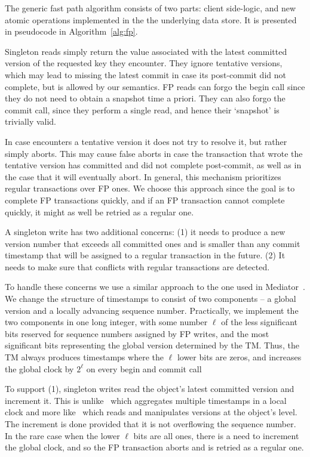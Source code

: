 The generic fast  path algorithm consists of two parts: 
client side-logic, and new atomic operations implemented in the the underlying data store.
It is presented in pseudocode in Algorithm~\ref{alg:fp}. 

Singleton reads simply return the value associated with the  latest committed version of the requested key they encounter.  
They ignore tentative versions, which may lead to missing the latest commit in case its post-commit did not complete, 
but is allowed by our semantics. 
FP reads can forgo the begin call since they do not need to obtain a snapshot time a priori. 
They can also forgo the commit call, since they perform a single read, and hence their `snapshot' is trivially valid.

In case   encounters a tentative version it does not try to resolve it, but rather simply aborts.
This may cause false aborts in case the transaction that wrote the tentative version has committed and did not 
complete post-commit, as well as in the case that it will eventually abort. 
In general, this mechanism prioritizes regular transactions over FP ones. We choose this approach since
the goal is to complete FP transactions quickly, and if an FP transaction cannot complete quickly, it might as well be 
retried as a regular one.
   
A singleton write has two additional concerns: (1) it needs to  produce a new version number that exceeds all committed ones and
is smaller than any commit timestamp that will be assigned to a regular transaction in the future.
(2)  It needs to make sure that conflicts with regular transactions are detected. 

To handle these concerns we use a similar approach to the one used in Mediator~\cite{mediator}.
We change the structure of timestamps to consist of two 
components -- a global version and a locally advancing sequence number.
Practically, we implement the two components in one long integer, with some number $\ell$ of the less significant bits
reserved for sequence numbers assigned by FP writes, and the most significant bits representing 
the global version determined by the TM. Thus, the TM always produces timestamps where the $\ell$ lower bits are zeros, and increases the global clock by $2^\ell$ on every begin and commit call  

To support (1), singleton writes read the object's latest committed version and increment it. This is unlike~\cite{mediator} which aggregates multiple timestamps in a local clock and more like~\cite{cockroach} which reads and manipulates versions at the object's level.
The increment is done provided that it is not overflowing the sequence number. 
In the rare case when the lower $\ell$ bits are all ones, there is a need to increment the global clock, and so the FP transaction aborts and is retried as a regular one. 

